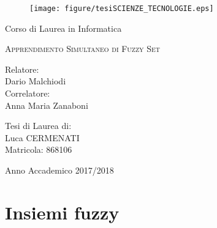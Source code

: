\documentclass [11pt,a4paper,twoside,openright] {book}
\begin{document}
\begin{titlepage}
\begin{figure}
\centering
\texttt{[image: figure/tesiSCIENZE\_TECNOLOGIE.eps]}
\vspace{0.5 cm}
\end{figure}
\begin{center}
{\LARGE Corso di Laurea in Informatica}
\end{center}
\begin{center}
\vspace{2 cm}
{\Large \textsc{Apprendimento Simultaneo di Fuzzy Set} }
\end{center}
\par
\vspace{2 cm}
\begin{flushleft}
Relatore:\\ Dario Malchiodi\\
\noindent Correlatore:\\ Anna Maria Zanaboni
\end{flushleft}
\vspace{1 cm}
\begin{flushright}
Tesi di Laurea di:\\ Luca CERMENATI\\ Matricola: 868106
\end{flushright} 	  
\vfill
\begin{center}
{\large Anno Accademico 2017/2018}
\end{center}
\end{titlepage}
\tableofcontents
\chapter{Insiemi fuzzy}
\end{document}
